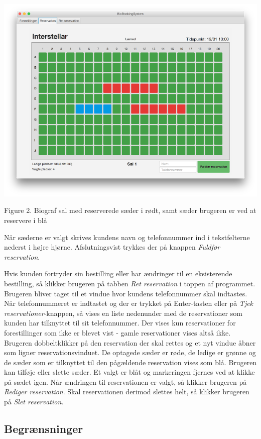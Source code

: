\documentclass[final]{rapport1}
\begin{document}
\begin{picture}

\includegraphics[width=.700\textwidth, center]{3.png}

\end{picture}
\begin{center}
\tiny Figure 2. Biograf sal med reserverede sæder i rødt, samt sæder brugeren er ved at reservere i blå
\end{center}

Når sæderne er valgt skrives kundens navn og telefonnummer ind i tekstfelterne nederst i højre hjørne. Afslutningsvist trykkes der på knappen \emph{Fuldfør reservation}. 

Hvis kunden fortryder sin bestilling eller har ændringer til en eksisterende bestilling, så klikker brugeren på tabben \emph{Ret reservation} i toppen af programmet. Brugeren bliver taget til et vindue hvor kundens telefonnummer skal indtastes. Når telefonnummeret er indtastet og der er trykket på Enter-tasten eller på \emph{Tjek reservationer}-knappen, så vises en liste nedenunder med de reservationer som kunden har tilknyttet til sit telefonnummer. Der vises kun reservationer for forestillinger som ikke er blevet vist - gamle reservationer vises altså ikke. Brugeren dobbeltklikker på den reservation der skal rettes og et nyt vindue åbner som ligner reservationsvinduet. De optagede sæder er røde, de ledige er grønne og de sæder som er tilknyttet til den pågældende reservation vises som blå. Brugeren kan tilføje eller slette sæder. Et valgt er blåt og markeringen fjernes ved at klikke på sædet igen. Når ændringen til reservationen er valgt, så klikker brugeren på \emph{Rediger reservation}. Skal reservationen derimod slettes helt, så klikker brugeren på \emph{Slet reservation}.

\subsection{Begrænsninger}
\end{document}
